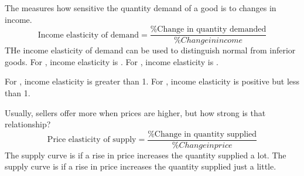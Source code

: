 \documentclass{article}
\begin{document}
The  measures how sensitive the quantity demand of a good is to changes in income. $$\textrm{Income elasticity of demand} = \frac{\textrm{\% Change in quantity demanded}}{{\% Change in income}}$$ THe income elasticity of demand can be used to distinguish normal from inferior goods. For , income elasticity is . For , income elasticity is . 

\begin{remark}
  For , income elasticity is greater than 1. For , income elasticity is positive but less than 1. 
\end{remark}

Usually, sellers offer more when prices are higher, but how strong is that relationship? $$\textrm{Price elasticity of supply} = \frac{\textrm{\% Change in quantity supplied}}{{\% Change in price}}$$ The supply curve is  if a rise in price increases the quantity supplied a lot. The supply curve is  if a rise in price increases the quantity supplied just a little. 
\end{document}

